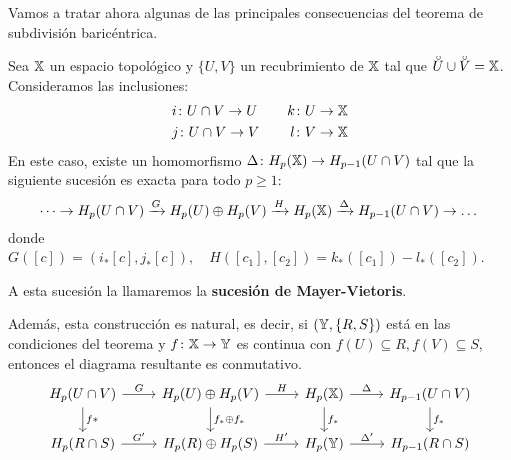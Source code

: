 Vamos a tratar ahora algunas de las principales consecuencias del teorema de subdivisión baricéntrica.

\begin{theorem}
  Sea ${\mathbb X}$ un espacio topológico y $\{U, V\}$ un recubrimiento de ${\mathbb X}$ tal que $\interior{U} \cup \interior{V} = \X$. Consideramos las inclusiones:
  \begin{align*}
    & i \colon U \cap V \to U &\quad k \colon U \to {\mathbb X} \\
    & j \colon U \cap V \to V &\quad l \colon V \to {\mathbb X}
  \end{align*}
  En este caso, existe un homomorfismo $\Delta \colon H_p({\mathbb X}) \to H_{p-1}(U \cap V)$ tal que la siguiente sucesión es exacta para todo $p \geq 1$:
  \[ \dots \to H_p(U \cap V) \xrightarrow{G} H_p(U) \oplus H_p(V) \xrightarrow{H} H_p({\mathbb X}) \xrightarrow{\Delta} H_{p-1}(U \cap V) \to \dots \]
  donde $G([c]) = (i_*[c], j_*[c]), \quad H([c_1], [c_2]) = k_*([c_1]) - l_*([c_2])$.

  A esta sucesión la llamaremos la \textbf{sucesión de Mayer-Vietoris}.

  Además, esta construcción es natural, es decir, si $({\mathbb Y}, \{R, S\})$ está en las condiciones del teorema y $f \colon {\mathbb X} \to {\mathbb Y}$ es continua con
  $f(U) \subseteq R, f(V) \subseteq S$, entonces el diagrama resultante es conmutativo.
  \[ \begin{tikzcd}
    H_p(U \cap V) \arrow{r}{G} \arrow{d}{f*} & H_p(U) \oplus H_p(V) \arrow{r}{H} \arrow{d}{f_*  \oplus f_*} & H_p(\X) \arrow{r}{\Delta} \arrow{d}{f_*} & H_{p-1}(U \cap V) \arrow{d}{f_*} \\
    H_p(R \cap S) \arrow{r}{G'}  & H_p(R) \oplus H_p(S) \arrow{r}{H'} & H_p(\Y) \arrow{r}{\Delta'} & H_{p-1}(R \cap S)
  \end{tikzcd} \]

\end{theorem}

